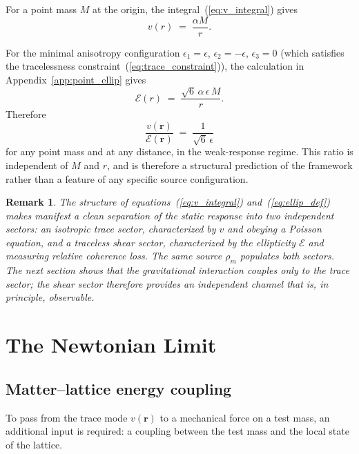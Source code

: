 \documentclass[pdflatex,sn-mathphys-num]{sn-jnl}%
\theoremstyle{thmstyleone}%
\theoremstyle{thmstyletwo}%
\newtheorem{remark}{Remark}%
\theoremstyle{thmstylethree}%
\begin{document}
For a point mass $M$ at the origin, the
integral~(\ref{eq:v_integral}) gives
\begin{equation}
    v(r)
    \;=\;
    \frac{\alpha M}{r}.
    \label{eq:v_point}
\end{equation}

For the minimal anisotropy configuration
$\epsilon_1=\epsilon$, $\epsilon_2=-\epsilon$, $\epsilon_3=0$
(which satisfies the tracelessness
constraint~(\ref{eq:trace_constraint})), the calculation in
Appendix~\ref{app:point_ellip} gives
\begin{equation}
    \mathcal{E}(r)
    \;=\;
    \frac{\sqrt{6}\,\alpha\,\epsilon\,M}{r}.
    \label{eq:E_point}
\end{equation}
Therefore
\begin{equation}
\boxed{\;
    \frac{v(\mathbf{r})}{\mathcal{E}(\mathbf{r})}
    \;=\;
    \frac{1}{\sqrt{6}\,\epsilon}\;
}
\label{eq:v_E_ratio}
\end{equation}
for any point mass and at any distance, in the
weak-response regime. This ratio is independent of $M$ and
$r$, and is therefore a structural prediction of the framework
rather than a feature of any specific source configuration.

\begin{remark}
\label{rem:trace_shear_separation}
The structure of equations~(\ref{eq:v_integral})
and~(\ref{eq:ellip_def}) makes manifest a clean separation of
the static response into two independent sectors: an
\emph{isotropic} trace sector, characterized by 
$v$ and obeying a Poisson equation, and a \emph{traceless} shear
sector, characterized by the ellipticity $\mathcal{E}$ and
measuring relative coherence loss. The same source $\rho_m$
populates both sectors. The next section shows that the
gravitational interaction couples only to the trace sector;
the shear sector therefore provides an independent channel that
is, in principle, observable.
\end{remark}

\section{The Newtonian Limit}
\label{sec:newtonian}

\subsection{Matter--lattice energy coupling}

To pass from the trace mode $v(\mathbf{r})$ to a mechanical force on a test
mass, an additional input is required: a coupling between the
test mass and the local state of the lattice.
\end{document}
